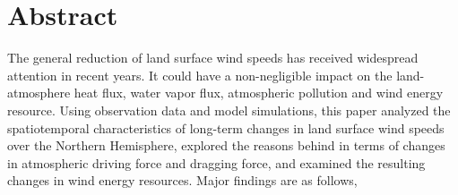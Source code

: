 \intobmk\chapter*{Abstract}%

The general reduction of land surface wind speeds has received widespread attention in recent years. It could have a non-negligible impact on the land-atmosphere heat flux, water vapor flux, atmospheric pollution and wind energy resource. Using observation data and model simulations, this paper analyzed the spatiotemporal characteristics of long-term changes in land surface wind speeds over the Northern Hemisphere, explored the reasons behind in terms of changes in atmospheric driving force and dragging force, and examined the resulting changes in wind energy resources. Major findings are as follows,

